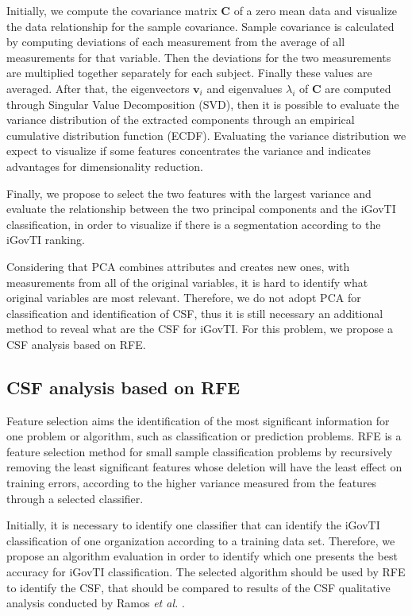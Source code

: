 Initially, we compute the covariance matrix $\mathbf{C}$ of a zero mean data and visualize the data relationship for the sample covariance. Sample covariance is calculated by computing deviations of each measurement from the average of all measurements for that variable. Then the deviations for the two measurements are multiplied together separately for each subject. Finally these values are averaged. After that, the eigenvectors $\mathbf{v}_i$ and eigenvalues $\lambda_i$ of $\mathbf{C}$ are computed through Singular Value Decomposition (SVD), then it is possible to evaluate the variance distribution of the extracted components through an empirical cumulative distribution function (ECDF). Evaluating the variance distribution we expect to visualize if some features concentrates the variance and indicates advantages for dimensionality reduction.

Finally, we propose to select the two features with the largest variance and evaluate the relationship between the two principal components and the iGovTI classification, in order to visualize if there is a segmentation according to the iGovTI ranking.

Considering that PCA combines attributes and creates new ones, with measurements from all of the original variables, it is hard to identify what original variables are most relevant. Therefore, we do not adopt PCA for classification and identification of CSF, thus it is still necessary an additional method to reveal what are the CSF for iGovTI. For this problem, we propose a CSF analysis based on RFE.

\subsection{CSF analysis based on RFE}
\label{sec:b_csfa}

Feature selection aims the identification of the most significant information for one problem or algorithm, such as classification or prediction problems. RFE is a feature selection method for small sample classification problems by recursively removing the least significant features whose deletion will have the least effect on training errors, according to the higher variance measured from the features through a selected classifier. 

Initially, it is necessary to identify one classifier that can identify the iGovTI classification of one organization according to a training data set. Therefore, we propose an algorithm evaluation in order to identify which one presents the best accuracy for iGovTI classification. The selected algorithm should be used by RFE to identify the CSF, that should be compared to results of the CSF qualitative analysis conducted by Ramos \emph{et al.} .

